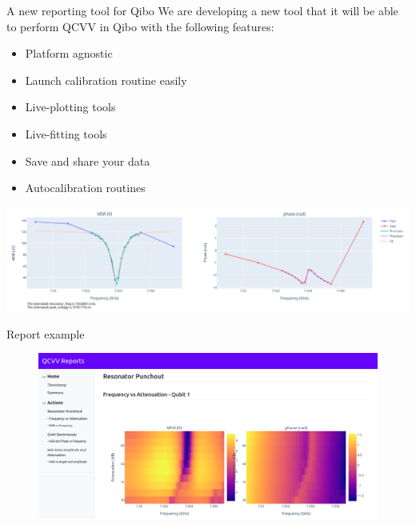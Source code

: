 \documentclass[11pt]{beamer}
\begin{document}
\begin{frame}{A new reporting tool for Qibo}
    We are developing a new tool that it will be able to perform QCVV in Qibo
    with the following features:
            \begin{multicols*}{2}
                \begin{itemize}
                    \item[\faCaretSquareORight] Platform agnostic
                    \item[\faCaretSquareORight] Launch calibration routine easily
                    \item[\faCaretSquareORight] Live-plotting tools
                    \item[\faCaretSquareORight] Live-fitting tools
                    \item[\faCaretSquareORight]Save and share your data
                    \item[\faCaretSquareORight] Autocalibration routines
                \end{itemize}
            \end{multicols*}
            \includegraphics[width=\textwidth]{figures/resonator.png}
            

   
\end{frame}

\begin{frame}{Report example}
    
    \begin{figure}
        \includegraphics[width=\textwidth]{figures/qcvv.png}
    \end{figure}
    
\end{frame}
\end{document}
